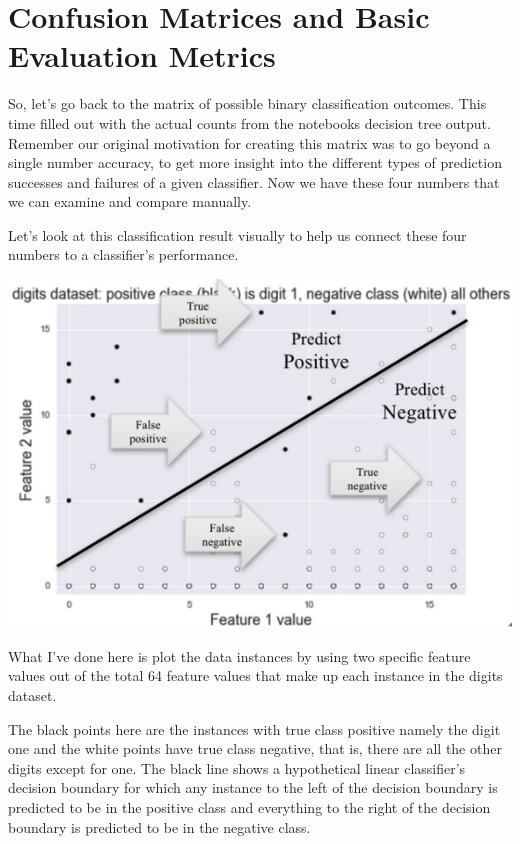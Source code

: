 \section{Confusion Matrices and Basic Evaluation Metrics}
\begin{multicols}{2}

So, let's go back to the matrix of possible binary classification outcomes. This time filled out with the actual counts from the notebooks decision tree output. Remember our original motivation for creating this matrix was to go beyond a single number accuracy, to get more insight into the different types of prediction successes and failures of a given classifier. Now we have these four numbers that we can examine and compare manually. 

Let's look at this classification result visually to help us connect these four numbers to a classifier's performance. 

\begin{center}
\includegraphics[width=\linewidth]{img/Diff-error-types-visualization.png} 
\end{center}

What I've done here is plot the data instances by using two specific feature values out of the total 64 feature values that make up each instance in the digits dataset. 

The black points here are the instances with true class positive namely the digit one and the white points have true class negative, that is, there are all the other digits except for one. The black line shows a hypothetical linear classifier's decision boundary for which any instance to the left of the decision boundary is predicted to be in the positive class and everything to the right of the decision boundary is predicted to be in the negative class. 


\end{multicols}
